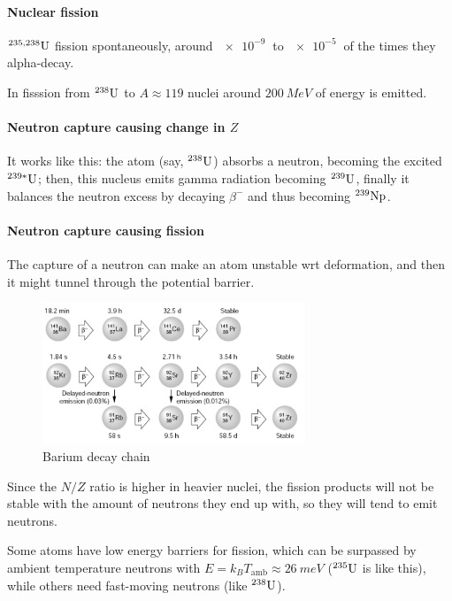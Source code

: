 \documentclass[main.tex]{subfiles}
\begin{document}
\paragraph{Nuclear fission}

\(^{235, 238}\ce{U} \) fission spontaneously, around \(\SI{e-9}{}\) to \(\SI{e-5}{} \) of the times they alpha-decay.

In fisssion from \(^{238} \ce{U} \) to \(A \approx 119\) nuclei around \(\SI{200}{MeV} \) of energy is emitted.

\paragraph{Neutron capture causing change in \(Z\)}

It works like this: the atom (say, \(^{238} \ce{U} \)) absorbs a neutron, becoming the excited \(^{239*} \ce{U} \); then, this nucleus emits gamma radiation becoming \(^{239} \ce{U} \), finally it balances the neutron excess by decaying \(\beta^-\) and thus becoming \(^{239} \ce{Np} \).

\paragraph{Neutron capture causing fission}

The capture of a neutron can make an atom unstable wrt deformation, and then it might tunnel through the potential barrier.

\begin{figure}
    \centering
    \includegraphics[width=0.7\textwidth]{figures/barium_decay_chain.png}
    \caption{Barium decay chain}
    \label{fig:barium-decay}
\end{figure}

Since the \(N/Z\) ratio is higher in heavier nuclei, the fission products will not be stable with the amount of neutrons they end up with, so they will tend to emit neutrons.

Some atoms have low energy barriers for fission, which can be surpassed by ambient temperature neutrons with \(E = k_B T_ \text{amb} \approx \SI{26}{meV} \) (\(^{235} \ce{U} \) is like this), while others need fast-moving neutrons (like \(^{238} \ce{U} \)).
\end{document}
